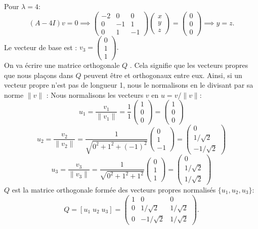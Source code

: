 \documentclass[12pt]{report}
\begin{document}
\noindent Pour $\lambda = 4$:
\[
    (A - 4I)v = 0 \implies
    \begin{pmatrix} -2 & 0 & 0 \\ 0 & -1 & 1 \\ 0 & 1 & -1 \end{pmatrix}
    \begin{pmatrix}x\\y\\z\end{pmatrix} =
    \begin{pmatrix}0\\0\\0\end{pmatrix} \implies y=z.
\]
Le vecteur de base est : $v_3 = \begin{pmatrix}0\\1\\1\end{pmatrix}.$
\[
\]
\noindent On va écrire une matrice orthogonale $Q$ . Cela signifie que les vecteurs propres que nous plaçons dans $Q$ peuvent être et {orthogonaux} entre eux. Ainsi, si un vecteur propre n'est pas de longueur 1, nous le normalisons en le divisant par sa norme $\|v\|$ : Nous normalisons les vecteurs $v$ en $u = v/\|v\|$:
\[
    u_1 = \frac{v_1}{\|v_1\|} = \frac{1}{1} \begin{pmatrix}1\\0\\0\end{pmatrix} = \begin{pmatrix}1\\0\\0\end{pmatrix}
\]
\[
    u_2 = \frac{v_2}{\|v_2\|} = \frac{1}{\sqrt{0^2+1^2+(-1)^2}} \begin{pmatrix}0\\1\\-1\end{pmatrix} = \begin{pmatrix}0\\1/\sqrt{2}\\-1/\sqrt{2}\end{pmatrix}
\]
\[
    u_3 = \frac{v_3}{\|v_3\|} = \frac{1}{\sqrt{0^2+1^2+1^2}} \begin{pmatrix}0\\1\\1\end{pmatrix} = \begin{pmatrix}0\\1/\sqrt{2}\\1/\sqrt{2}\end{pmatrix}
\]
\noindent $Q$ est la matrice {orthogonale} formée des vecteurs propres normalisés $\{u_1, u_2, u_3\}$:
\[
    Q = [u_1 \; u_2 \; u_3] =
    \begin{pmatrix}
        1 & 0           & 0          \\
        0 & 1/\sqrt{2}  & 1/\sqrt{2} \\
        0 & -1/\sqrt{2} & 1/\sqrt{2}
    \end{pmatrix}.
\]
\end{document}
